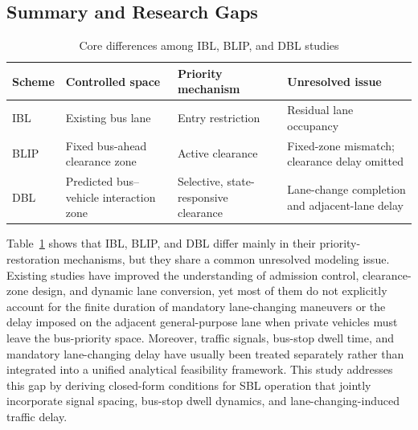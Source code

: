 \subsection{Summary and Research Gaps}

\begin{table}[htbp]
\centering
\caption{Core differences among IBL, BLIP, and DBL studies}
\label{tab_sbl_literature_summary}
\begin{tabular}{p{}p{}p{}p{}}
\hline
Scheme & Controlled space & Priority mechanism & Unresolved issue \\
\hline
IBL & Existing bus lane & Entry restriction & Residual lane occupancy \\
BLIP & Fixed bus-ahead clearance zone & Active clearance & Fixed-zone mismatch; clearance delay omitted \\
DBL & Predicted bus--vehicle interaction zone & Selective, state-responsive clearance & Lane-change completion and adjacent-lane delay \\
\hline
\end{tabular}
\end{table}

Table~\ref{tab_sbl_literature_summary} shows that IBL, BLIP, and DBL differ mainly in their priority-restoration mechanisms, but they share a common unresolved modeling issue. Existing studies have improved the understanding of admission control, clearance-zone design, and dynamic lane conversion, yet most of them do not explicitly account for the finite duration of mandatory lane-changing maneuvers or the delay imposed on the adjacent general-purpose lane when private vehicles must leave the bus-priority space. Moreover, traffic signals, bus-stop dwell time, and mandatory lane-changing delay have usually been treated separately rather than integrated into a unified analytical feasibility framework. This study addresses this gap by deriving closed-form conditions for SBL operation that jointly incorporate signal spacing, bus-stop dwell dynamics, and lane-changing-induced traffic delay.
